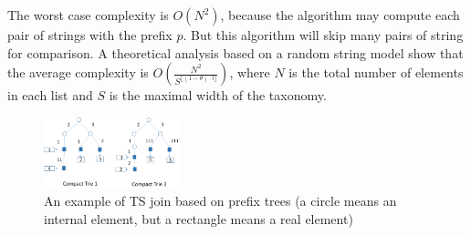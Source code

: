 The worst case complexity is $O(N^2)$, because the algorithm may compute each pair of strings with the prefix $p$. But this algorithm will skip many pairs of string for comparison. A theoretical analysis based on a random string model show that the average complexity is $O(\frac{N^2}{S^{\lfloor (1-\theta) \cdot l \rfloor}})$, where $N$ is the total number of elements in each list and $S$ is the maximal width of the taxonomy.



\begin{figure}[t]
\centering
\includegraphics[width=0.35\textwidth]{figures/prefixTrees}
 \caption{An example of TS join based on prefix trees (a circle means an internal element, but a rectangle means a real element)}
\label{fig:taxonomyexample}
\end{figure}


